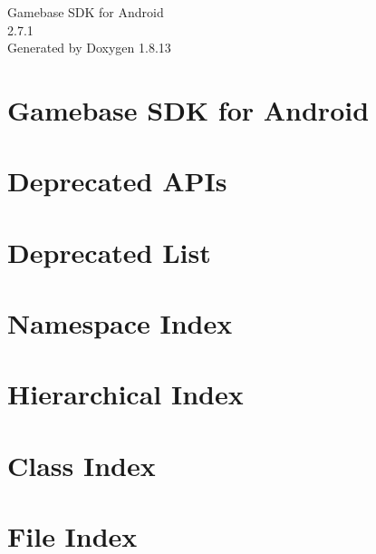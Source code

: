 \documentclass[twoside]{book}
\newcommand{\+}{\discretionary{\mbox{\scriptsize$\hookleftarrow$}}{}{}}
\newcommand{\clearemptydoublepage}{%
  \newpage{\pagestyle{empty}\cleardoublepage}%
}
\begin{document}
\hypersetup{pageanchor=false,
             bookmarksnumbered=true,
             pdfencoding=unicode
            }
\begin{titlepage}
\vspace*{7cm}
\begin{center}%
{\Large Gamebase S\+DK for Android \\[1ex]\large 2.\+7.\+1 }\\
\vspace*{1cm}
{\large Generated by Doxygen 1.8.13}\\
\end{center}
\end{titlepage}
\clearemptydoublepage
{}
\tableofcontents
\clearemptydoublepage
{}
\hypersetup{pageanchor=true}

\chapter{Gamebase S\+DK for Android}
\label{index}\hypertarget{index}{}
\chapter{Deprecated A\+P\+Is}
\label{md__deprecated_a_p_is}

\chapter{Deprecated List}
\label{deprecated}

\chapter{Namespace Index}

\chapter{Hierarchical Index}

\chapter{Class Index}

\chapter{File Index}

\end{document}

